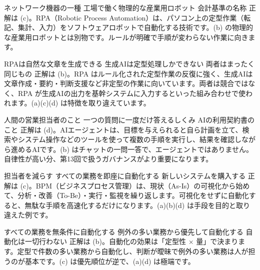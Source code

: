 
%
  {ネットワーク機器の一種}%
  {工場で働く物理的な産業用ロボット}%
  {}%
  {会計基準の名称}%
  {正解は (c)。RPA（Robotic Process Automation）は、パソコン上の定型作業（転記、集計、入力）をソフトウェアロボットで自動化する技術です。(b) の物理的な産業用ロボットとは別物です。ルールが明確で手順が変わらない作業に向きます。}

%
  {RPAは自然な文章を生成できる}%
  {}%
  {生成AIは定型処理しかできない}%
  {両者はまったく同じもの}%
  {正解は (b)。RPA はルール化された定型作業の反復に強く、生成AIは文章作成・要約・判断支援など非定型の作業に向いています。両者は競合ではなく、RPA が生成AIの出力を基幹システムに入力するといった組み合わせで使われます。(a)(c)(d) は特徴を取り違えています。}

%
  {人間の営業担当者のこと}%
  {一つの質問に一度だけ答えるしくみ}%
  {AIの利用契約書のこと}%
  {}%
  {正解は (d)。AIエージェントは、目標を与えられると自ら計画を立て、検索やシステム操作などのツールを使って複数の手順を実行し、結果を確認しながら進めるAIです。(b) はチャットの一問一答で、エージェントではありません。自律性が高い分、第13回で扱うガバナンスがより重要になります。}

%
  {担当者を減らす}%
  {すべての業務を即座に自動化する}%
  {}%
  {新しいシステムを購入する}%
  {正解は (c)。BPM（ビジネスプロセス管理）は、現状（As-Is）の可視化から始めて、分析・改善（To-Be）・実行・監視を繰り返します。可視化をせずに自動化すると、無駄な手順を高速化するだけになります。(a)(b)(d) は手段を目的と取り違えた例です。}

%
  {すべての業務を無条件に自動化する}%
  {}%
  {例外の多い業務から優先して自動化する}%
  {自動化は一切行わない}%
  {正解は (b)。自動化の効果は「定型性 × 量」で決まります。定型で件数の多い業務から自動化し、判断が曖昧で例外の多い業務は人が担うのが基本です。(c) は優先順位が逆で、(a)(d) は極端です。}
